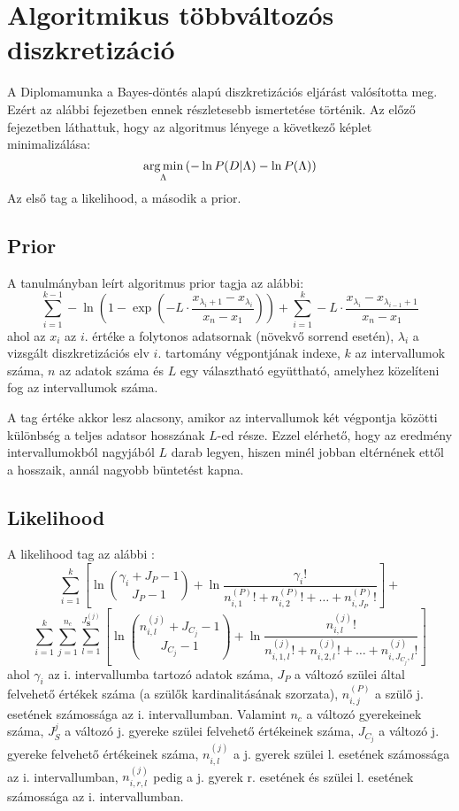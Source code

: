 \chapter{Algoritmikus többváltozós diszkretizáció}
\label{chapter:bayesdontesalapu}
A Diplomamunka a Bayes-döntés alapú diszkretizációs eljárást valósította meg. Ezért az alábbi fejezetben ennek részletesebb ismertetése történik. Az előző fejezetben láthattuk, hogy az algoritmus lényege a következő képlet minimalizálása:
$$ \mathop{\mathrm{arg\,min}}_{\Lambda}{(-\ln{P(D | \Lambda)} - \ln{P(\Lambda)})}$$
Az első tag a likelihood, a második a prior.

\section{Prior}
A tanulmányban \cite{chen2017learning} leírt algoritmus prior tagja az alábbi:
$$\sum_{i=1}^{k-1} -\ln{(1-\exp{(
-L \cdot \frac{x_{\lambda_i+1}-x_{\lambda_i}}{x_{n}-x_{1}})})} +
\sum_{i=1}^{k}
-L \cdot \frac{x_{\lambda_i}-x_{\lambda_{i-1}+1}}{x_{n}-x_{1}}$$
ahol az $x_i$ az $i$. értéke a folytonos adatsornak (növekvő sorrend esetén), $\lambda_i$ a vizsgált diszkretizációs elv $i$. tartomány végpontjának indexe, $k$ az intervallumok száma, $n$ az adatok száma és $L$ egy választható együttható, amelyhez közelíteni fog az intervallumok száma.

A tag értéke akkor lesz alacsony, amikor az intervallumok két végpontja közötti különbség a teljes adatsor hosszának $L$-ed része. Ezzel elérhető, hogy az eredmény intervallumokból nagyjából $L$ darab legyen, hiszen minél jobban eltérnének ettől a hosszaik, annál nagyobb büntetést kapna.

\section{Likelihood}
A likelihood tag az alábbi \cite{boulle2006modl}:
$$
\sum_{i = 1}^{k} \left[ \ln \binom{\gamma_i+J_P-1}{J_P-1} + \ln \frac{\gamma_i!}{n_{i,1}^{(P)}! + n_{i,2}^{(P)}! + \dotsc + n_{i,J_P}^{(P)}!}\right] +
$$
$$
\sum_{i = 1}^{k}\sum_{j=1}^{n_c} \sum_{l=1}^{J_\textbf{S}^{(j)}} \left[ \ln \binom{n_{i,l}^{(j)}+J_{C_j}-1}{J_{C_j}-1} + \ln \frac{n_{i,l}^{(j)}!} {n_{i,1,l}^{(j)}! + n_{i,2,l}^{(j)}! + \dotsc + n_{i,J_{C_j},l}^{(j)}!}  \right]
$$
ahol $\gamma_i$ az i. intervallumba tartozó adatok száma, $J_P$ a változó szülei által felvehető értékek száma (a szülők kardinalitásának szorzata), $n_{i,j}^{(P)}$ a szülő j. esetének számossága az i. intervallumban.
Valamint $n_c$ a változó gyerekeinek száma, $J_S^{j}$ a változó j. gyereke szülei felvehető értékeinek száma, $J_{C_j}$ a változó j. gyereke felvehető értékeinek száma, $n_{i,l}^{(j)}$ a j. gyerek szülei l. esetének számossága az i. intervallumban, $n_{i,r,l}^{(j)}$ pedig a j. gyerek r. esetének és szülei l. esetének számossága az i. intervallumban.


